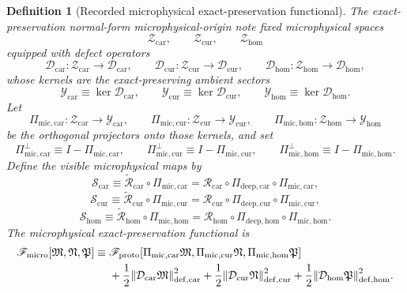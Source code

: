 \documentclass[11pt]{article}
\newcommand{\ProtoFunctional}{\mathscr F_{\mathrm{proto}}}
\newcommand{\UltraFunctional}{\mathscr F_{\mathrm{micro}}}
\newcommand{\CarRead}{\mathcal R_{\mathrm{car}}}
\newcommand{\CurRead}{\mathcal R_{\mathrm{cur}}}
\newcommand{\HomRead}{\mathcal R_{\mathrm{hom}}}
\newcommand{\ProtoTensorClass}{\mathscr Y_{\mathrm{car}}}
\newcommand{\ProtoRelabelClass}{\mathscr Y_{\mathrm{cur}}}
\newcommand{\ProtoFreeClass}{\mathscr Y_{\mathrm{hom}}}
\newcommand{\ProtoCarProj}{\Pi_{\mathrm{deep,car}}}
\newcommand{\ProtoCurProj}{\Pi_{\mathrm{deep,cur}}}
\newcommand{\ProtoHomProj}{\Pi_{\mathrm{deep,hom}}}
\newcommand{\ProtoCarRead}{\widetilde{\mathcal R}_{\mathrm{car}}}
\newcommand{\ProtoCurRead}{\widetilde{\mathcal R}_{\mathrm{cur}}}
\newcommand{\ProtoHomRead}{\widetilde{\mathcal R}_{\mathrm{hom}}}
\newcommand{\UltraTensorClass}{\mathscr Z_{\mathrm{car}}}
\newcommand{\UltraRelabelClass}{\mathscr Z_{\mathrm{cur}}}
\newcommand{\UltraFreeClass}{\mathscr Z_{\mathrm{hom}}}
\newcommand{\UltraTensor}{\mathfrak M}
\newcommand{\UltraRelabel}{\mathfrak N}
\newcommand{\UltraFree}{\mathfrak P}
\newcommand{\UltraCarProj}{\Pi_{\mathrm{mic,car}}}
\newcommand{\UltraCurProj}{\Pi_{\mathrm{mic,cur}}}
\newcommand{\UltraHomProj}{\Pi_{\mathrm{mic,hom}}}
\newcommand{\UltraCarPerp}{\Pi_{\mathrm{mic,car}}^{\perp}}
\newcommand{\UltraCurPerp}{\Pi_{\mathrm{mic,cur}}^{\perp}}
\newcommand{\UltraHomPerp}{\Pi_{\mathrm{mic,hom}}^{\perp}}
\newcommand{\TensorDefect}{\mathcal D_{\mathrm{car}}}
\newcommand{\CurDefect}{\mathcal D_{\mathrm{cur}}}
\newcommand{\HomDefect}{\mathcal D_{\mathrm{hom}}}
\newcommand{\UltraCarRead}{\mathcal S_{\mathrm{car}}}
\newcommand{\UltraCurRead}{\mathcal S_{\mathrm{cur}}}
\newcommand{\UltraHomRead}{\mathcal S_{\mathrm{hom}}}
\newtheorem{definition}{Definition}
\begin{document}
\begin{definition}[Recorded microphysical exact-preservation functional]
\label{def:Fultra}
The exact-preservation normal-form microphysical-origin note fixed microphysical spaces
\[
\UltraTensorClass,\qquad
\UltraRelabelClass,\qquad
\UltraFreeClass
\]
equipped with defect operators
\begin{equation}
\TensorDefect:\UltraTensorClass\to\mathscr D_{\mathrm{car}},
\qquad
\CurDefect:\UltraRelabelClass\to\mathscr D_{\mathrm{cur}},
\qquad
\HomDefect:\UltraFreeClass\to\mathscr D_{\mathrm{hom}},
\label{eq:defects}
\end{equation}
whose kernels are the exact-preserving ambient sectors
\begin{equation}
\ProtoTensorClass\equiv \ker\TensorDefect,
\qquad
\ProtoRelabelClass\equiv \ker\CurDefect,
\qquad
\ProtoFreeClass\equiv \ker\HomDefect.
\label{eq:proto_kernels}
\end{equation}
Let
\begin{equation}
\UltraCarProj:\UltraTensorClass\to\ProtoTensorClass,
\qquad
\UltraCurProj:\UltraRelabelClass\to\ProtoRelabelClass,
\qquad
\UltraHomProj:\UltraFreeClass\to\ProtoFreeClass
\label{eq:ultra_proj}
\end{equation}
be the orthogonal projectors onto those kernels, and set
\begin{equation}
\UltraCarPerp\equiv I-\UltraCarProj,
\qquad
\UltraCurPerp\equiv I-\UltraCurProj,
\qquad
\UltraHomPerp\equiv I-\UltraHomProj.
\label{eq:ultra_perp}
\end{equation}
Define the visible microphysical maps by
\begin{equation}
\UltraCarRead\equiv \ProtoCarRead\circ\UltraCarProj
=
\CarRead\circ\ProtoCarProj\circ\UltraCarProj,
\label{eq:ultra_car_map}
\end{equation}
\begin{equation}
\UltraCurRead\equiv \ProtoCurRead\circ\UltraCurProj
=
\CurRead\circ\ProtoCurProj\circ\UltraCurProj,
\label{eq:ultra_cur_map}
\end{equation}
\begin{equation}
\UltraHomRead\equiv \ProtoHomRead\circ\UltraHomProj
=
\HomRead\circ\ProtoHomProj\circ\UltraHomProj.
\label{eq:ultra_hom_map}
\end{equation}
The microphysical exact-preservation functional is
\begin{equation}
\begin{aligned}
\UltraFunctional[\UltraTensor,\UltraRelabel,\UltraFree]
\equiv\;
&\ProtoFunctional[
\UltraCarProj\UltraTensor,\UltraCurProj\UltraRelabel,\UltraHomProj\UltraFree]
\\
&+\frac12\norm{\TensorDefect\UltraTensor}_{\mathrm{def,car}}^2
+\frac12\norm{\CurDefect\UltraRelabel}_{\mathrm{def,cur}}^2
+\frac12\norm{\HomDefect\UltraFree}_{\mathrm{def,hom}}^2.
\end{aligned}
\label{eq:Fultra}
\end{equation}
\end{definition}
\end{document}
